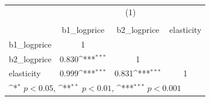 {
\def\sym#1{\ifmmode^{#1}\else\(^{#1}\)\fi}
\begin{tabular}{l*{3}{c}}
\hline\hline
          &\multicolumn{3}{c}{(1)}                                 \\
          &\multicolumn{3}{c}{}                                    \\
          &b1\_logprice         &b2\_logprice         &elasticity         \\
\hline
b1\_logprice&        1         &                  &                  \\
b2\_logprice&    0.830\sym{***}&        1         &                  \\
elasticity&    0.999\sym{***}&    0.831\sym{***}&        1         \\
\hline\hline
\multicolumn{4}{l}{\footnotesize \sym{*} \(p<0.05\), \sym{**} \(p<0.01\), \sym{***} \(p<0.001\)}\\
\end{tabular}
}
